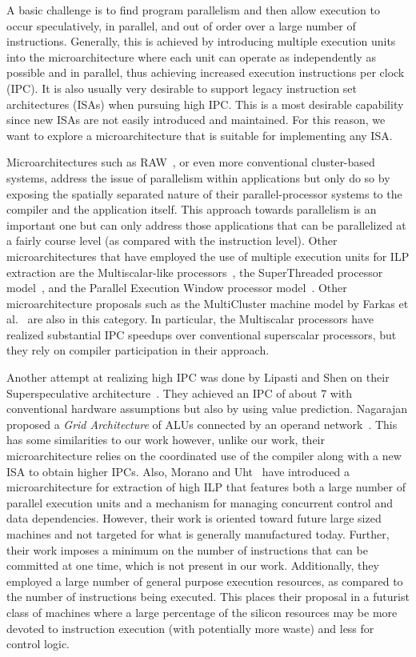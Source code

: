 \documentclass[10pt,dvips]{article}
\begin{document}
A basic challenge 
is to find program parallelism and then allow execution to occur
speculatively, in parallel, and out of order over 
a large number of instructions.
Generally, this is achieved by introducing multiple
execution units into the microarchitecture where each unit
can operate as independently as possible and in parallel, thus
achieving increased execution instructions per clock (IPC).
It is also usually very desirable to support legacy instruction
set architectures (ISAs) when pursuing high IPC. 
This is a most desirable capability since new ISAs are
not easily introduced and maintained.
For this reason, we want to explore a
microarchitecture that is suitable for implementing any ISA.

Microarchitectures such as RAW~\cite{waingold97,taylor02},
or even more conventional cluster-based systems,
address the issue of parallelism within applications but only do so
by exposing the spatially separated nature of their
parallel-processor systems to the compiler and the application itself.
This approach towards parallelism is an important one but
can only address those applications that can be parallelized at
a fairly course level (as compared with the instruction level).
Other microarchitectures that have employed the
use of multiple execution units for ILP extraction are the Multiscalar-like
processors~\cite{Sohi95,sundararaman97multiscalar},
the SuperThreaded processor model~\cite{tsai96superthread},
and
the Parallel Execution Window processor model~\cite{kemp96pew}.
Other microarchitecture proposals such as the MultiCluster machine
model by 
Farkas et al.~\cite{farkas97multicluster} are also in this category.
In particular, the Multiscalar processors have
realized substantial IPC speedups over conventional superscalar
processors, but they rely on compiler participation in their
approach.

Another attempt at realizing high IPC was done by
Lipasti and Shen on their Superspeculative
architecture~\cite{Lip97}.  They achieved an IPC of
about 7 with conventional hardware assumptions but
also by using value prediction.
Nagarajan proposed a {\em Grid Architecture} of ALUs
connected by an operand network~\cite{Nag01}.  
This has some similarities to our work
however, unlike our work, their microarchitecture
relies on the coordinated use of the compiler along with
a new ISA to obtain higher IPCs.
Also, Morano and Uht~\cite{morano02high,uht02realizing}
have introduced a microarchitecture for extraction of
high ILP that features both
a large number of parallel execution units and a 
mechanism for managing concurrent control and data dependencies.
However, their work is oriented toward future large sized machines
and not targeted for what is generally manufactured today.
Further, their work imposes a minimum on the number of instructions
that can be committed at one time, which is not present in our work.
Additionally, they 
employed a large number of general purpose execution resources, as
compared to the number of instructions being executed.
This places their proposal in a futurist class of machines
where a large percentage of the silicon resources may be more 
devoted to instruction execution (with potentially more waste) 
and less for control logic.
\end{document}
